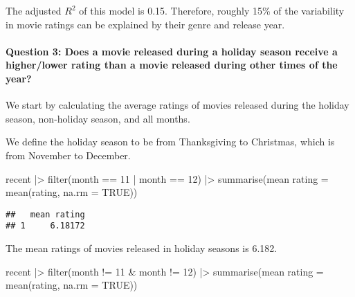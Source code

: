 \documentclass[
]{article}
\newenvironment{Shaded}{\begin{snugshade}}{\end{snugshade}}
\newcommand{\AttributeTok}[1]{\textcolor[rgb]{0.77,0.63,0.00}{#1}}
\newcommand{\ConstantTok}[1]{\textcolor[rgb]{0.00,0.00,0.00}{#1}}
\newcommand{\DecValTok}[1]{\textcolor[rgb]{0.00,0.00,0.81}{#1}}
\newcommand{\FunctionTok}[1]{\textcolor[rgb]{0.00,0.00,0.00}{#1}}
\newcommand{\NormalTok}[1]{#1}
\newcommand{\OtherTok}[1]{\textcolor[rgb]{0.56,0.35,0.01}{#1}}
\newcommand{\SpecialCharTok}[1]{\textcolor[rgb]{0.00,0.00,0.00}{#1}}
\newcommand{\StringTok}[1]{\textcolor[rgb]{0.31,0.60,0.02}{#1}}
\begin{document}
The adjusted \(R^2\) of this model is 0.15. Therefore, roughly 15\% of
the variability in movie ratings can be explained by their genre and
release year.

\hypertarget{question-3-does-a-movie-released-during-a-holiday-season-receive-a-higherlower-rating-than-a-movie-released-during-other-times-of-the-year}{%
\paragraph{Question 3: Does a movie released during a holiday season
receive a higher/lower rating than a movie released during other times
of the
year?}\label{question-3-does-a-movie-released-during-a-holiday-season-receive-a-higherlower-rating-than-a-movie-released-during-other-times-of-the-year}}

We start by calculating the average ratings of movies released during
the holiday season, non-holiday season, and all months.

We define the holiday season to be from Thanksgiving to Christmas, which
is from November to December.

\begin{Shaded}
\begin{Highlighting}[]
\NormalTok{recent }\SpecialCharTok{|\textgreater{}}
  \FunctionTok{filter}\NormalTok{(month }\SpecialCharTok{==} \DecValTok{11} \SpecialCharTok{|}\NormalTok{ month }\SpecialCharTok{==} \DecValTok{12}\NormalTok{) }\SpecialCharTok{|\textgreater{}}
  \FunctionTok{summarise}\NormalTok{(}\StringTok{\textasciigrave{}}\AttributeTok{mean rating}\StringTok{\textasciigrave{}} \OtherTok{=} \FunctionTok{mean}\NormalTok{(rating, }\AttributeTok{na.rm =} \ConstantTok{TRUE}\NormalTok{))}
\end{Highlighting}
\end{Shaded}

\begin{verbatim}
##   mean rating
## 1     6.18172
\end{verbatim}

The mean ratings of movies released in holiday seasons is 6.182.

\begin{Shaded}
\begin{Highlighting}[]
\NormalTok{recent }\SpecialCharTok{|\textgreater{}}
  \FunctionTok{filter}\NormalTok{(month }\SpecialCharTok{!=} \DecValTok{11} \SpecialCharTok{\&}\NormalTok{ month }\SpecialCharTok{!=} \DecValTok{12}\NormalTok{) }\SpecialCharTok{|\textgreater{}}
  \FunctionTok{summarise}\NormalTok{(}\StringTok{\textasciigrave{}}\AttributeTok{mean rating}\StringTok{\textasciigrave{}} \OtherTok{=} \FunctionTok{mean}\NormalTok{(rating, }\AttributeTok{na.rm =} \ConstantTok{TRUE}\NormalTok{))}
\end{Highlighting}
\end{Shaded}
\end{document}
